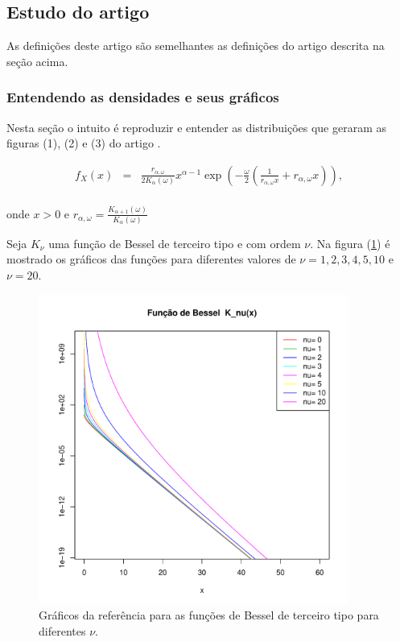 \documentclass[10pt,a4paper]{article}
\begin{document}
\subsection{Estudo do artigo  \cite{freitas_frery_2005}}

As definições deste artigo são semelhantes as definições do artigo \cite{anfinsen2009} descrita na seção acima. 

\subsubsection{ Entendendo as densidades e seus gráficos}

Nesta seção o intuito é reproduzir e entender as distribuições que geraram as figuras (1), (2) e (3) do artigo \cite{freitas_frery_2005}. 

\begin{equation}\label{sec51eqn1}
\begin{array}{ccc}
	f_{X}(x)&=&\frac{r_{\alpha,\omega}}{2K_{\alpha}(\omega)}x^{\alpha-1}\exp\left(-\frac{\omega}{2}\left(\frac{1}{r_{\alpha,\omega}x}+ r_{\alpha,\omega}x\right)\right), \\
\end{array}
\end{equation}

onde $x>0$  e $r_{\alpha,\omega}=\frac{K_{\alpha+1}(\omega)}{K_{\alpha}(\omega)}$

Seja $K_{\nu}$ uma função de Bessel de terceiro tipo e com ordem $\nu$. Na figura (\ref{sec51fig1}) é mostrado os gráficos das funções para diferentes valores de $\nu=1,2,3,4,5,10$ e $\nu=20$. 
\begin{figure}[!htb]
\centering
\includegraphics[width=4.0in]{fun_bessel_nu.pdf}
	\caption{Gráficos da referência \cite{freitas_frery_2005} para as funções de Bessel de terceiro tipo para diferentes $\nu$.}
\label{sec51fig1}
\end{figure}
\end{document}
